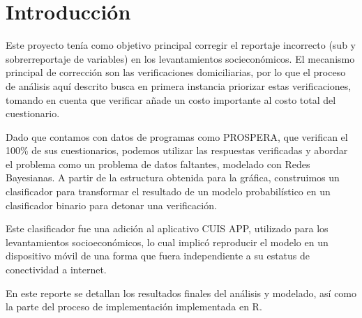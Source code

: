 \chapter{Introducción}
\label{chap:intro}
Este proyecto tenía como objetivo principal corregir el reportaje incorrecto (sub y sobrerreportaje de variables) en los levantamientos socieconómicos. El mecanismo principal de corrección son las verificaciones domiciliarias, por lo que el proceso de análisis aquí descrito busca en primera instancia priorizar estas verificaciones, tomando en cuenta que verificar añade un costo importante al costo total del cuestionario.
\par
\noindent
Dado que contamos con datos de programas como PROSPERA, que verifican el 100\% de sus cuestionarios, podemos utilizar las respuestas verificadas y abordar el problema como un problema de datos faltantes, modelado con Redes Bayesianas. A partir de la estructura obtenida para la gráfica, construimos un clasificador para transformar el resultado de un modelo probabilístico en un clasificador binario para detonar una verificación.
\par
\noindent
Este clasificador fue una adición al aplicativo CUIS APP, utilizado para los levantamientos socioeconómicos, lo cual implicó reproducir el modelo en un dispositivo móvil de una forma que fuera independiente a su estatus de conectividad a internet.
\par
\noindent
En este reporte se detallan los resultados finales del análisis y modelado, así como la parte del proceso de implementación implementada en R.
